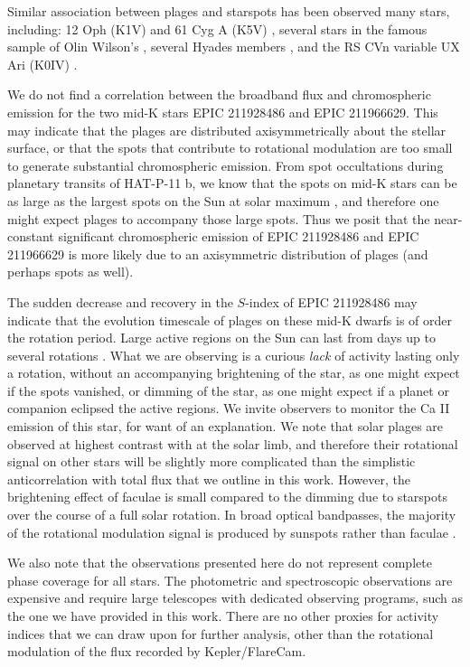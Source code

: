 Similar association between plages and starspots has been observed many stars, including: 12 Oph (K1V) and 61 Cyg A (K5V) \citep{Dorren1982}, several stars in the famous sample of Olin Wilson's \citep{Radick1983}, several Hyades members \citep{Lockwood1984}, and the RS CVn variable UX Ari (K0IV) \citep{Gu2005}. 

We do not find a correlation between the broadband flux and chromospheric emission for the two mid-K stars EPIC 211928486 and EPIC 211966629. This may indicate that the plages are distributed axisymmetrically about the stellar surface, or that the spots that contribute to rotational modulation are too small to generate substantial chromospheric emission. From spot occultations during planetary transits of HAT-P-11 b, we know that the spots on mid-K stars can be as large as the largest spots on the Sun at solar maximum \citep{Morris2017a, Morris2018d}, and therefore one might expect plages to accompany those large spots. Thus we posit that the near-constant significant chromospheric emission of EPIC 211928486 and EPIC 211966629 is more likely due to an axisymmetric distribution of plages (and perhaps spots as well).  

The sudden decrease and recovery in the $S$-index of EPIC 211928486 may indicate that the evolution timescale of plages on these mid-K dwarfs is of order the rotation period. Large active regions on the Sun can last from days up to several rotations \citep{Solanki2003}. What we are observing is a curious \textit{lack} of activity lasting only a rotation, without an accompanying brightening of the star, as one might expect if the spots vanished, or dimming of the star, as one might expect if a planet or companion eclipsed the active regions. We invite observers to monitor the Ca II emission of this star, for want of an explanation. 
We note that solar plages are observed at highest contrast with at the solar limb, and therefore their rotational signal on other stars will be slightly more complicated than the simplistic anticorrelation with total flux that we outline in this work. However, the brightening effect of faculae is small compared to the dimming due to starspots over the course of a full solar rotation. In broad optical bandpasses, the majority of the rotational modulation signal is produced by sunspots rather than faculae \citep{Shapiro2016}.

We also note that the observations presented here do not represent complete phase coverage for all stars. The photometric and spectroscopic observations are expensive and require large telescopes with dedicated observing programs, such as the one we have provided in this work. There are no other proxies for activity indices that we can draw upon for further analysis, other than the rotational modulation of the flux recorded by Kepler/FlareCam. 

